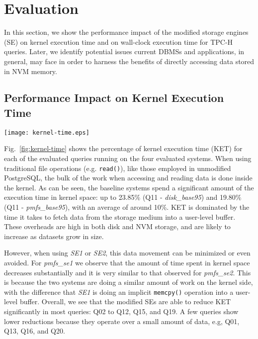 \section{Evaluation}
\label{sec:evaluation}
\noindent In this section, we show the performance impact of the modified storage engines (SE) on kernel execution time and on wall-clock execution time for TPC-H queries. Later, we identify potential issues current DBMSs and applications, in general, may face in order to harness the benefits of  directly accessing data stored in NVM memory.



\subsection{Performance Impact on Kernel Execution Time}

\begin{figure*}
\centering
\texttt{[image: kernel-time.eps]}
\caption{Percentage of kernel execution time for each query}
\label{fig:kernel-time}
\end{figure*}

Fig.~\ref{fig:kernel-time} shows the percentage of kernel execution time (KET) for each of the evaluated queries 
running on the four evaluated 
systems. When using traditional file operations (e.g. \verb+read()+), like those employed in unmodified PostgreSQL, the bulk of the work when 
accessing and reading data is done inside the kernel. As can be seen, the baseline systems spend a significant amount of the execution time in 
kernel space: up to 
23.85\% 
(Q11 - \textit{disk\_base95}) and 
19.80\% 
(Q11 - \textit{pmfs\_base95}), with an average of around 10\%. 
KET is dominated by 
the time it takes to fetch data from the storage medium into a user-level buffer. These overheads are high in both disk and NVM storage, 
and are likely to increase as datasets grow in size.

However, when using \textit{SE1} or \textit{SE2}, this data movement can be minimized or even avoided. 
For \textit{pmfs\_se1} we observe that the amount of time spent in kernel space decreases substantially 
and it is very similar to that observed for \textit{pmfs\_se2}. This is because the two systems are 
doing a similar amount of work on the kernel side, with the difference that \textit{SE1} is doing an 
implicit \verb+memcpy()+ operation into a user-level buffer. 
Overall, we see that the modified SEs are able to reduce KET significantly in  most queries: 
Q02 to Q12, Q15, and Q19. A few queries show lower reductions because they operate over a small amount of 
data, e.g, Q01, Q13, Q16, and Q20. 
 
